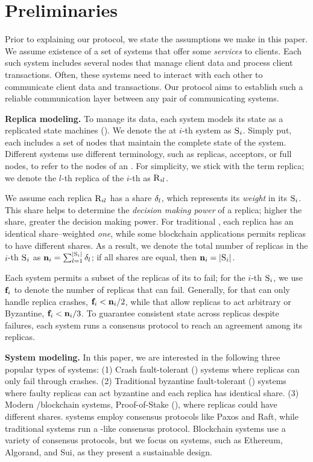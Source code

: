 \section{Preliminaries}
Prior to explaining our \Scrooge{} protocol, we state the assumptions we make 
in this paper.
We assume existence of a set of systems that offer some {\em services} to clients.
Each such system includes several nodes that manage client data and process client transactions.
Often, these systems need to interact with each other to communicate client data and transactions.
Our \Scrooge{} protocol aims to establish such a reliable communication layer 
between any pair of communicating systems.

{\bf Replica modeling.}
To manage its data, each system models its state as a replicated state machines (\RSM{}).
We denote the \RSM{} at $i$-th system as $\textsc{S}_{i}$.
Simply put, each \RSM{} includes a set of nodes that maintain the 
complete state of the system. 
Different systems use different terminology, such as replicas, acceptors, or full nodes, to refer
to the nodes of an \RSM{}.
For simplicity, we stick with the term replica;
we denote the $l$-th replica of the $i$-th \RSM{} as $\textsc{R}_{{i}{l}}$.

We assume each replica $\textsc{R}_{{i}{l}}$ has a share ${\delta}_{l}$, which represents its {\em weight} 
in its \RSM{} $\textsc{S}_{i}$.
This share helps to determine the {\em decision making power} of a replica; 
higher the share, greater the decision making power.
For traditional , each replica has an identical share--weighted {\em one}, while 
some blockchain applications permits replicas to have different shares.
As a result, we denote the total number of replicas in the $i$-th \RSM{} $\textsc{S}_{i}$ as 
$\textbf{n}_{i} = \sum_{l=1}^{\lvert \textsc{S}_{i} \rvert} {\delta}_{l}$; 
if all shares are equal, then $\textbf{n}_{i} = \lvert \textsc{S}_{i} \rvert$.

Each system permits a subset of the replicas of its \RSM{} to fail; 
for the $i$-th \RSM{} $\textsc{S}_{i}$, we use $\textbf{f}_{i}$ to denote the number of replicas that can fail.
Generally, for  that can only handle replica crashes, $\textbf{f}_{i} < \textbf{n}_{i}/2$, 
while  that allow replicas to act arbitrary or Byzantine, $\textbf{f}_{i} < \textbf{n}_{i}/3$.
To guarantee consistent state across replicas despite failures, 
each system runs a consensus protocol to reach an agreement among its replicas.


{\bf System modeling.}
In this paper, we are interested in the following three popular types of systems:
(1) Crash fault-tolerant (\CFT{}) systems where replicas can only fail through crashes. 
(2) Traditional byzantine fault-tolerant (\BFT{}) systems where faulty replicas can act byzantine 
and each replica has identical share.
(3) Modern \BFT/blockchain systems, Proof-of-Stake (\PoS{}), where replicas could have different shares.
\CFT{} systems employ consensus protocols like Paxos and Raft, while traditional \BFT{} systems
run a \pbft{}-like consensus protocol.
Blockchain systems use a variety of consensus protocols, but we focus on \PoS{} systems, 
such as Ethereum, Algorand, and Sui, as they present a sustainable design.

